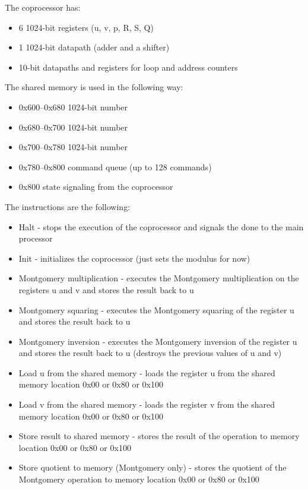 The coprocessor has:
\begin{itemize}
\item 6 1024-bit registers (u, v, p, R, S, Q)
\item 1 1024-bit datapath (adder and a shifter)
\item 10-bit datapaths and registers for loop and address counters
\end{itemize}

\noindent
The shared memory is used in the following way:
\begin{itemize}
\item 0x600--0x680 1024-bit number
\item 0x680--0x700 1024-bit number
\item 0x700--0x780 1024-bit number
\item 0x780--0x800 command queue (up to 128 commands)
\item 0x800 state signaling from the coprocessor
\end{itemize}

\noindent
The instructions are the following:
\begin{itemize}
\item Halt - stops the execution of the coprocessor and signals the
  done to the main processor
\item Init - initializes the coprocessor (just sets the modulus for now)
\item Montgomery multiplication - executes the Montgomery
  multiplication on the registers u and v and stores the result back
  to u
\item Montgomery squaring - executes the Montgomery squaring of the
  register u and stores the result back to u
\item Montgomery inversion - executes the Montgomery inversion of the
  register u and stores the result back to u (destroys the previous
  values of u and v)
\item Load u from the shared memory - loads the register u from the
  shared memory location 0x00 or 0x80 or 0x100
\item Load v from the shared memory - loads the register v from the
  shared memory location 0x00 or 0x80 or 0x100
\item Store result to shared memory - stores the result of the
  operation to memory location 0x00 or 0x80 or 0x100
\item Store quotient to memory (Montgomery only) - stores the quotient
  of the Montgomery operation to memory location 0x00 or 0x80 or 0x100
\end{itemize}


